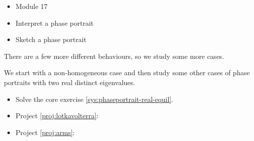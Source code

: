 \bookonlynewpage

\begin{lesson}

	\begin{itemize}
		\item Module 17
	\end{itemize}

	\begin{itemize}
		\item Interpret a phase portrait
		\item Sketch a phase portrait
	\end{itemize}
	

There are a few more different behaviours, so we study some more cases. 

We start with a non-homogeneous case and then study some other cases of phase portraits with two real distinct eigenvalues.

\begin{itemize}
	\item Solve the core exercise \ref{sys:phaseportrait-real-equil}.
\end{itemize}


\begin{itemize}
	\item Project \ref{proj:lotkavolterra}: \lotkavolterratitle
	\item Project \ref{proj:arms}: \armstitle
\end{itemize}


\end{lesson}

